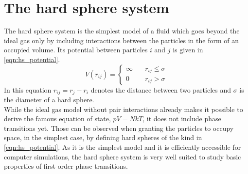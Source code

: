 

\section{The hard sphere system}
\label{sec:HS_system}
The hard sphere system is the simplest model of a fluid which goes beyond the ideal gas only by including interactions between the particles in the form of an occupied volume. Its potential between particles $i$ and $j$ is given in \autoref{eqn:hs_potential}.
\begin{equation}
\label{eqn:hs_potential}
V(r_{ij})=%
\begin{cases}
\infty \quad & r_{ij} \le \sigma \\
0 \quad & r_{ij} > \sigma
\end{cases}
\end{equation}
In this equation $r_{ij} = r_j - r_i$ denotes the distance between two particles and $\sigma$ is the diameter of a hard sphere.\\

While the ideal gas model without pair interactions already makes it possible to derive the famous equation of state, $pV=NkT$, it does not include phase transitions yet. Those can be observed when granting the particles to occupy space, in the simplest case, by defining hard spheres of the kind in \autoref{eqn:hs_potential}. As it is the simplest model and it is efficiently accessible for computer simulations, the hard sphere system is very well suited to study basic properties of first order phase transitions.\\ 

